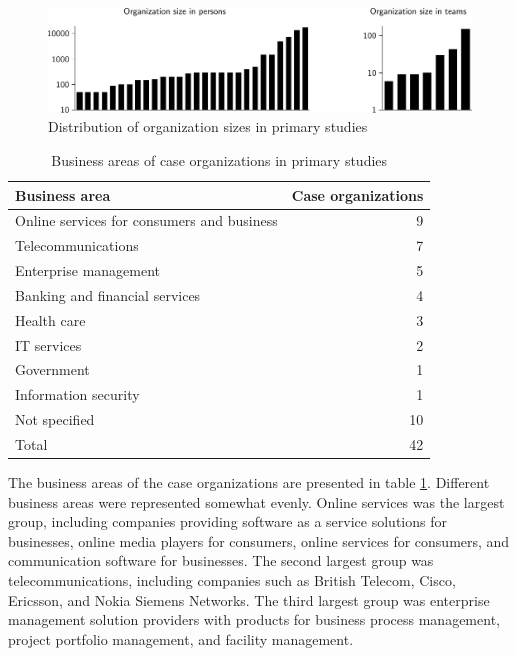 \documentclass[preprint,authoryear,12pt]{elsarticle}
\begin{document}
\begin{figure}[!t]
  \begin{center}
    \includegraphics[width=1\textwidth]{graphics/organization_size.pdf}
    \caption{Distribution of organization sizes in primary studies}
    \label{fig:organization_size}
  \end{center}
\end{figure}

\begin{table}[!t]
    \centering
    \begin{tabular}{ l r }
        \toprule
        Business area    &  Case organizations   \\
        \midrule
		Online services for consumers and business  &  9  \\
		Telecommunications                          &  7  \\
		Enterprise management                       &  5  \\
		Banking and financial services              &  4  \\
		Health care                                  &  3  \\
		IT services                                 &  2  \\
		Government                                  &  1  \\
		Information security                        &  1  \\
		Not specified                               & 10  \\
        \midrule
		Total                                       & 42  \\
        \bottomrule
    \end{tabular}
    \caption{Business areas of case organizations in primary studies}
    \label{table:businessareas}
\end{table}

The business areas of the case organizations are presented in table
\ref{table:businessareas}. Different business areas were represented somewhat
evenly. Online services was the largest group, including companies
providing software as a service solutions for businesses, online media players
for consumers, online services for consumers, and communication software for
businesses. The second largest group was telecommunications, including companies
such as British Telecom, Cisco, Ericsson, and Nokia Siemens Networks. The third
largest group was enterprise management solution providers with products for
business process management, project portfolio management, and facility
management.
\end{document}
